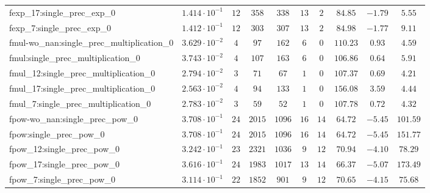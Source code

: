 \begin{tabular}{|l|c|c|c|c|c|c|c|c|c|}
fexp\_17:single\_prec\_exp\_0                  & $ 1.414 \cdot 10^{-1} $ & $ 12     $ & $ 358    $ & $ 338   $ & $ 13  $ & $ 2  $ & $ 84.85       $ & $ -1.79   $ & $ 5.55    $ \\
fexp\_7:single\_prec\_exp\_0                   & $ 1.412 \cdot 10^{-1} $ & $ 12     $ & $ 303    $ & $ 307   $ & $ 13  $ & $ 2  $ & $ 84.98       $ & $ -1.77   $ & $ 9.11    $ \\
fmul-wo\_nan:single\_prec\_multiplication\_0   & $ 3.629 \cdot 10^{-2} $ & $ 4      $ & $ 97     $ & $ 162   $ & $ 6   $ & $ 0  $ & $ 110.23      $ & $ 0.93    $ & $ 4.59    $ \\
fmul:single\_prec\_multiplication\_0           & $ 3.743 \cdot 10^{-2} $ & $ 4      $ & $ 107    $ & $ 163   $ & $ 6   $ & $ 0  $ & $ 106.86      $ & $ 0.64    $ & $ 5.91    $ \\
fmul\_12:single\_prec\_multiplication\_0       & $ 2.794 \cdot 10^{-2} $ & $ 3      $ & $ 71     $ & $ 67    $ & $ 1   $ & $ 0  $ & $ 107.37      $ & $ 0.69    $ & $ 4.21    $ \\
fmul\_17:single\_prec\_multiplication\_0       & $ 2.563 \cdot 10^{-2} $ & $ 4      $ & $ 94     $ & $ 133   $ & $ 1   $ & $ 0  $ & $ 156.08      $ & $ 3.59    $ & $ 4.44    $ \\
fmul\_7:single\_prec\_multiplication\_0        & $ 2.783 \cdot 10^{-2} $ & $ 3      $ & $ 59     $ & $ 52    $ & $ 1   $ & $ 0  $ & $ 107.78      $ & $ 0.72    $ & $ 4.32    $ \\
fpow-wo\_nan:single\_prec\_pow\_0              & $ 3.708 \cdot 10^{-1} $ & $ 24     $ & $ 2015   $ & $ 1096  $ & $ 16  $ & $ 14 $ & $ 64.72       $ & $ -5.45   $ & $ 101.59  $ \\
fpow:single\_prec\_pow\_0                      & $ 3.708 \cdot 10^{-1} $ & $ 24     $ & $ 2015   $ & $ 1096  $ & $ 16  $ & $ 14 $ & $ 64.72       $ & $ -5.45   $ & $ 151.77  $ \\
fpow\_12:single\_prec\_pow\_0                  & $ 3.242 \cdot 10^{-1} $ & $ 23     $ & $ 2321   $ & $ 1036  $ & $ 9   $ & $ 12 $ & $ 70.94       $ & $ -4.10   $ & $ 78.29   $ \\
fpow\_17:single\_prec\_pow\_0                  & $ 3.616 \cdot 10^{-1} $ & $ 24     $ & $ 1983   $ & $ 1017  $ & $ 13  $ & $ 14 $ & $ 66.37       $ & $ -5.07   $ & $ 173.49  $ \\
fpow\_7:single\_prec\_pow\_0                   & $ 3.114 \cdot 10^{-1} $ & $ 22     $ & $ 1852   $ & $ 901   $ & $ 9   $ & $ 12 $ & $ 70.65       $ & $ -4.15   $ & $ 75.68   $ \\

\end{tabular}
